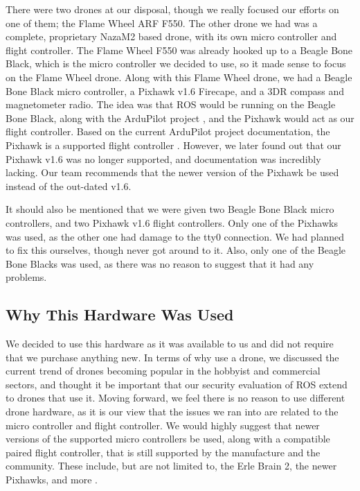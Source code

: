 \documentclass[IEEEtran,letterpaper,10pt,notitlepage,draftclsnofoot]{article}
\begin{document}
There were two drones at our disposal, though we really focused our efforts on one of them; the Flame Wheel ARF F550. The other drone we had was a complete, proprietary NazaM2 based drone, with its own micro controller
and flight controller. The Flame Wheel F550 was already hooked up to a Beagle Bone Black, which is the
micro controller we decided to use, so it made sense to focus on the Flame Wheel drone. Along with this
Flame Wheel drone, we had a Beagle Bone Black micro controller, a Pixhawk v1.6 Firecape, and a 3DR compass and
magnetometer radio. The idea was that ROS would be running on the Beagle Bone Black, along with the ArduPilot
project \cite{Ardu}, and the Pixhawk would act as our flight controller. Based on the current
ArduPilot project documentation, the Pixhawk is a supported flight controller \cite{ArduFlightController}.
However, we later found out that our Pixhawk v1.6 was no longer supported, and documentation was incredibly
lacking. Our team recommends that the newer version of the Pixhawk be used instead of the out-dated v1.6.

It should also be mentioned that we were given two Beagle Bone Black micro controllers, and two
Pixhawk v1.6 flight controllers. Only one of the Pixhawks was used, as the other one had damage to the
tty0 connection. We had planned to fix this ourselves, though never got around to it. Also, only one of the
Beagle Bone Blacks was used, as there was no reason to suggest that it had any problems.

\subsection{Why This Hardware Was Used}

We decided to use this hardware as it was available to us and did not require that we purchase anything new.
In terms of why use a drone, we discussed the current trend of drones becoming popular in the hobbyist and
commercial sectors, and thought it be important that our security evaluation of ROS extend to drones that use it. Moving forward, we feel there is no reason to use different drone hardware, as it is our view that the
issues we ran into are related to the micro controller and flight controller. We would highly suggest that
newer versions of the supported micro controllers be used, along with a compatible paired flight controller,
that is still supported by the manufacture and the community. These include, but are not limited to, the
Erle Brain 2, the newer Pixhawks, and more \cite{ArduFlightController}.
\end{document}
